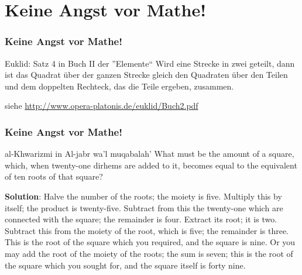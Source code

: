 \documentclass{beamer}
\begin{document}

\section{Keine Angst vor Mathe!}

\begin{frame} \frametitle{Keine Angst vor Mathe!}
	\begin{block}{Euklid: Satz 4 in Buch II der ''Elemente``}
		Wird eine Strecke in zwei geteilt, dann ist das Quadrat über der ganzen Strecke gleich den Quadraten über den Teilen und dem doppelten Rechteck, das die Teile ergeben, zusammen.
	\end{block}


	\small siehe \url{http://www.opera-platonis.de/euklid/Buch2.pdf}
\end{frame}

\begin{frame} \frametitle{Keine Angst vor Mathe!}
	\begin{block}{al-Khwarizmi in Al-jabr wa'l muqabalah'}
		\small What must be the amount of a square, which, when twenty-one
		dirhems are added to it, becomes equal to the equivalent of ten
		roots of that square?
		
		\textbf{Solution}: Halve the number of the roots; the moiety is five.
		Multiply this by itself; the product is twenty-five. Subtract from
		this the twenty-one which are connected with the square; the
		remainder is four. Extract its root; it is two. Subtract this from
		the moiety of the root, which is five; the remainder is three. This
		is the root of the square which you required, and the square is
		nine. Or you may add the root of the moiety of the roots; the
		sum is seven; this is the root of the square which you sought for,
		and the square itself is forty nine.
	\end{block}
\end{frame}
\end{document}
